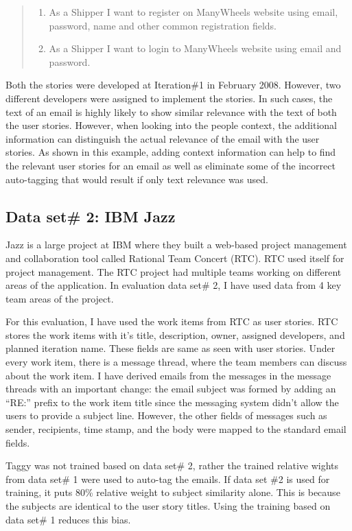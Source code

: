 \begin{quote}
	\begin{enumerate}
		\item As a Shipper I want to register on ManyWheels website using email, password, name and other common registration fields.
		\item As a Shipper I want to login to ManyWheels website using email and password.
	\end{enumerate}
\end{quote}

Both the stories were developed at Iteration\#1 in February 2008. However, two different developers were assigned to implement the stories. In such cases, the text of an email is highly likely to show similar relevance with the text of both the user stories. However, when looking into the people context, the additional information can distinguish the actual relevance of the email with the user stories. As shown in this example, adding context information can help to find the relevant user stories for an email as well as eliminate some of the incorrect auto-tagging that would result if only text relevance was used.

\subsection{Data set\# 2: IBM Jazz}
Jazz is a large project at IBM where they built a web-based project management and collaboration tool called Rational Team Concert (RTC). RTC used itself for project management. The RTC project had multiple teams working on different areas of the application. In evaluation data set\# 2, I have used data from 4 key team areas of the project.

For this evaluation, I have used the work items from RTC as user stories. RTC stores the work items with it's title, description, owner, assigned developers, and planned iteration name. These fields are same as seen with user stories. Under every work item, there is a message thread, where the team members can discuss about the work item. I have derived emails from the messages in the message threads with an important change: the email subject was formed by adding an ``RE:'' prefix to the work item title since the messaging system didn't allow the users to provide a subject line. However, the other fields of messages such as sender, recipients, time stamp, and the body were mapped to the standard email fields.

Taggy was not trained based on data set\# 2, rather the trained relative wights from data set\# 1 were used to auto-tag the emails. If data set \#2 is used for training, it puts 80\% relative weight to subject similarity alone. This is because the subjects are identical to the user story titles.  Using the training based on data set\# 1 reduces this bias.


